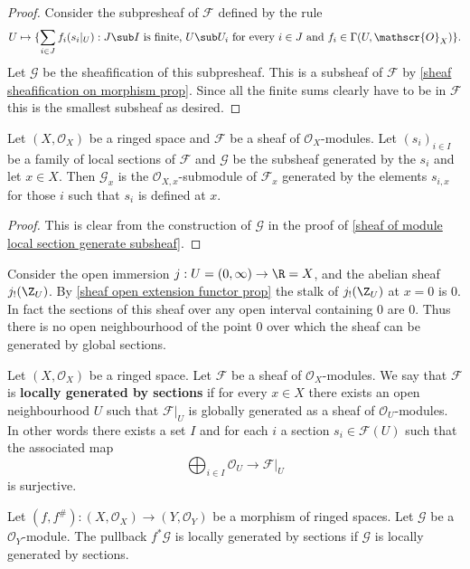\begin{proof}
Consider the subpresheaf of $\mathscr{F}$ defined by the rule
\[U\mapsto\{\sum_{i\in J}f_i(s_i|_U):\text{$J\sub I$ is finite, $U\sub U_i$ for every $i\in J$ and $f_i\in\Gamma(U,\mathscr{O}_X)$}\}.\]
Let $\mathscr{G}$ be the sheafification of this subpresheaf. This is a subsheaf of $\mathscr{F}$ by \cref{sheaf sheafification on morphism prop}. Since all the finite sums clearly have to be in $\mathscr{F}$ this is the smallest subsheaf as desired.
\end{proof}
\begin{proposition}
Let $(X,\mathscr{O}_X)$ be a ringed space and $\mathscr{F}$ be a sheaf of $\mathscr{O}_X$-modules. Let $(s_i)_{i\in I}$ be a family of local sections of $\mathscr{F}$ and $\mathscr{G}$ be the subsheaf generated by the $s_i$ and let $x\in X$. Then $\mathscr{G}_x$ is the $\mathscr{O}_{X,x}$-submodule of $\mathscr{F}_x$ generated by the elements $s_{i,x}$ for those $i$ such that $s_i$ is defined at $x$.
\end{proposition}
\begin{proof}
This is clear from the construction of $\mathscr{G}$ in the proof of \cref{sheaf of module local section generate subsheaf}.
\end{proof}
\begin{example}\label{sheaf of module not generated by global section eg}
Consider the open immersion $j:U=(0,\infty)\to\R=X$, and the abelian sheaf $j_!(\Z_U)$. By \cref{sheaf open extension functor prop} the stalk of $j_!(\Z_U)$ at $x=0$ is $0$. In fact the sections of this sheaf over any open interval containing $0$ are $0$. Thus there is no open neighbourhood of the point $0$ over which the sheaf can be generated by global sections.
\end{example}
Let $(X,\mathscr{O}_X)$ be a ringed space. Let $\mathscr{F}$ be a sheaf of $\mathscr{O}_X$-modules. We say that $\mathscr{F}$ is \textbf{locally generated by sections} if for every $x\in X$ there exists an open neighbourhood $U$ such that $\mathscr{F}|_U$ is globally generated as a sheaf of $\mathscr{O}_U$-modules. In other words there exists a set $I$ and for each $i$ a section $s_i\in\mathscr{F}(U)$ such that the associated map
\[\bigoplus_{i\in I}\mathscr{O}_U\to\mathscr{F}|_U\]
is surjective.
\begin{proposition}\label{pull back local generated section}
Let $(f,f^{\#}):(X,\mathscr{O}_X)\to(Y,\mathscr{O}_Y)$ be a morphism of ringed spaces. Let $\mathscr{G}$ be a $\mathscr{O}_Y$-module. The pullback $f^*\mathscr{G}$ is locally generated by sections if $\mathscr{G}$ is locally generated by sections.
\end{proposition}
